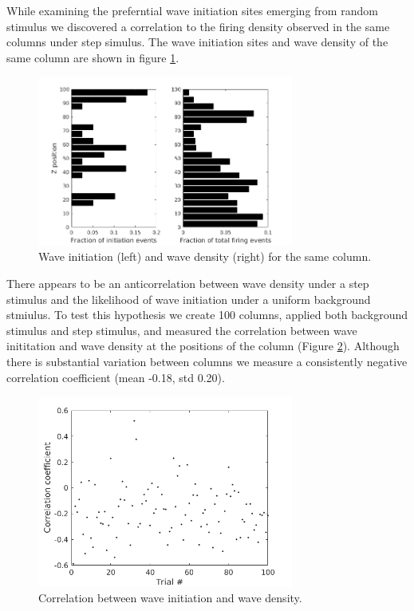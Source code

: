 \documentclass[a4paper,11pt]{article}
\begin{document}
While examining the preferntial wave initiation sites emerging from random stimulus we discovered a correlation to the firing density observed in the same columns under step simulus.
The wave initiation sites and wave density of the same column are shown in figure \ref{fig:initiation_density}.
\begin{figure}[!htb]
 \caption{Wave initiation (left) and wave density (right) for the same column.}
 \label{fig:initiation_density}
 \centering
   \includegraphics[width=0.75\textwidth]{fig/InitiationCorrelationHistogram}
\end{figure}

There appears to be an anticorrelation between wave density under a step stimulus and the likelihood of wave initiation under a uniform background stmiulus.
To test this hypothesis we create 100 columns, applied both background stimulus and step stimulus, and measured the correlation between wave inititation and wave density at the positions of the column (Figure \ref{fig:initiation_density_corr}).
Although there is substantial variation between columns we measure a consistently negative correlation coefficient (mean -0.18, std 0.20).
\begin{figure}[!htb]
 \caption{Correlation between wave initiation and wave density.}
 \label{fig:initiation_density_corr}
 \centering
   \includegraphics[width=0.75\textwidth]{fig/InitiationCorrelation}
\end{figure}
\end{document}
